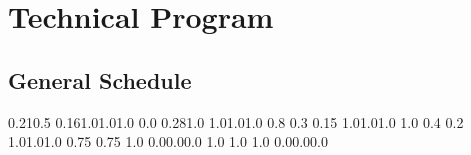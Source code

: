 \chapter{Technical Program}
\vspace{-15mm}
 \section{General Schedule}


  {0.21}{0.5} {0.16}{1.0}{1.0}{1.0}
   {0.0} {0.28}{1.0} {1.0}{1.0}{1.0}
      {0.8} {0.3} {0.15} {1.0}{1.0}{1.0}
 {1.0} {0.4} {0.2} {1.0}{1.0}{1.0}
   {0.75} {0.75} {1.0} {0.0}{0.0}{0.0}
   {1.0} {1.0} {1.0} {0.0}{0.0}{0.0}


\newcommand{\WorkshopsSchedule}[2]{
  \event #1 {0900} {1030} {09:00\\\vspace{0.2em}Workshops #2}        {90~min}                {MAR}                   {workshop}
  \event #1 {1030} {1100} {10:30 Break}                              {\vspace{1.5mm}30 min}  {\vspace{0.5em}MAR}     {break}
  \event #1 {1100} {1230} {11:00\\\vspace{0.2em}Workshops #2}        {90~min}                {MAR}                   {workshop}
  \event #1 {1400} {1530} {14:00\\\vspace{0.2em}Workshops #2}        {90~min}                {MAR}                   {workshop}
  \event #1 {1530} {1600} {15:30 Break}                              {\vspace{1.5mm}30 min}  {\vspace{0.5em}MAR}     {break}
  \event #1 {1600} {1730} {16:00\\\vspace{0.2em}Workshops #2}        {90~min}                {MAR}                   {workshop}
}

